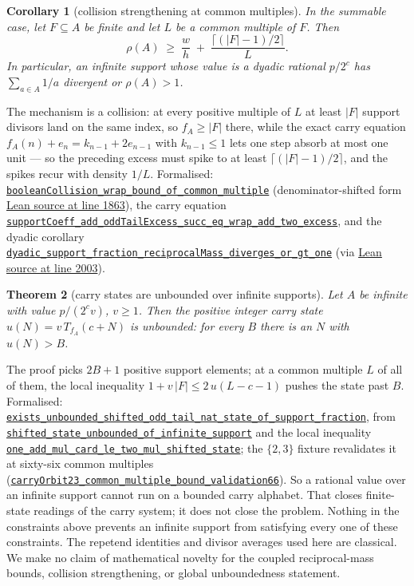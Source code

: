 \documentclass[11pt]{article}
\newcommand{\commit}{81150c1c6fdd4cd51e76d3aa0de344341e0e9e7c}
\newcommand{\repobase}{https://github.com/wcook04/plectis-lean-erdos249-257/blob/\commit}
\newcommand{\PK}{Erdos249257}
\newcommand{\lref}[3]{\href{\repobase/\PK/#1\#L#2}{\nolinkurl{#3}}}
\newcommand{\lrefx}[3]{\href{\repobase/\PK/#1\#L#2}{\nolinkurl{#3}}}
\newcommand{\lloc}[2]{\href{\repobase/\PK/#1\#L#2}{Lean source at line #2}}
\newtheorem{theorem}{Theorem}[section]
\newtheorem{corollary}[theorem]{Corollary}
\theoremstyle{definition}
\theoremstyle{remark}
\begin{document}
\begin{corollary}[collision strengthening at common multiples]\label{res:collision}
In the summable case, let $F\subseteq A$ be finite and let $L$ be a common
multiple of $F$. Then
\[
\rho(A)\;\ge\;\frac{w}{h}\;+\;\frac{\lceil(|F|-1)/2\rceil}{L}.
\]
In particular, an infinite support whose value is a dyadic rational $p/2^c$
has $\sum_{a\in A}1/a$ divergent or $\rho(A)>1$.
\end{corollary}
\noindent The mechanism is a collision: at every positive multiple of $L$ at
least $|F|$ support divisors land on the same index, so $f_A\ge|F|$ there,
while the exact carry equation $f_A(n)+e_n=k_{n-1}+2e_{n-1}$ with
$k_{n-1}\le1$ lets one step absorb at most one unit --- so the preceding
excess must spike to at least $\lceil(|F|-1)/2\rceil$, and the spikes recur
with density $1/L$. Formalised:
\lref{RationalSupportCarrySkeleton.lean}{2037}{booleanCollision_wrap_bound_of_common_multiple}
(denominator-shifted form
\lloc{RationalSupportCarrySkeleton.lean}{1863}),
the carry equation
\lrefx{RationalSupportCarrySkeleton.lean}{1651}{supportCoeff_add_oddTailExcess_succ_eq_wrap_add_two_excess},
and the dyadic corollary
\lref{RationalSupportCarrySkeleton.lean}{2200}{dyadic_support_fraction_reciprocalMass_diverges_or_gt_one}
(via \lloc{RationalSupportCarrySkeleton.lean}{2003}).

\begin{theorem}[carry states are unbounded over infinite supports]\label{res:unbounded}
Let $A$ be infinite with value $p/(2^c v)$, $v\ge1$. Then the positive integer
carry state $u(N)=v\,T_{f_A}(c+N)$ is unbounded: for every $B$ there is an $N$
with $u(N)>B$.
\end{theorem}
\noindent The proof picks $2B+1$ positive support elements; at a common
multiple $L$ of all of them, the local inequality $1+v\,|F|\le2\,u(L-c-1)$
pushes the state past $B$. Formalised:
\lref{RationalSupportCarrySkeleton.lean}{2377}{exists_unbounded_shifted_odd_tail_nat_state_of_support_fraction},
from
\lrefx{RationalSupportCarrySkeleton.lean}{2320}{shifted_state_unbounded_of_infinite_support}
and the local inequality
\lrefx{RationalSupportCarrySkeleton.lean}{2228}{one_add_mul_card_le_two_mul_shifted_state};
the $\{2,3\}$ fixture revalidates it at sixty-six common multiples
(\lrefx{RationalSupportCarrySkeleton.lean}{2401}{carryOrbit23_common_multiple_bound_validation66}).
So a rational value over an infinite support cannot run on a bounded carry
alphabet. That closes finite-state readings of the carry system; it does not
close the problem. Nothing in the constraints above
prevents an infinite support from satisfying every one of these constraints.
The repetend identities and divisor averages used here are classical. We make
no claim of mathematical novelty for the coupled reciprocal-mass bounds,
collision strengthening, or global unboundedness statement.
\end{document}
